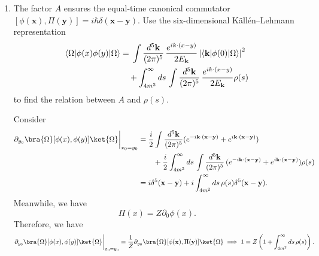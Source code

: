 \begin{enumerate}[label=\alph*)]
    \item The factor $A$ ensures the equal-time canonical commutator
    $[\phi(\mathbf x),\Pi(\mathbf y)]=i\hbar\delta(\mathbf x-\mathbf y)$.
    Use the six-dimensional K\"all\'en--Lehmann representation
    \begin{align}
        \langle\Omega|\phi(x)\phi(y)|\Omega\rangle
        &={}
        \int\frac{d^5\mathbf k}{(2\pi)^5}\,
        \frac{e^{ik\cdot(x-y)}}{2E_{\mathbf k}}
        \left|\langle\mathbf k|\phi(0)|\Omega\rangle\right|^2
        \notag\\
        &\quad+
        \int_{4m^2}^{\infty}ds\,
        \int\frac{d^5\mathbf k}{(2\pi)^5}\,
        \frac{e^{ik\cdot(x-y)}}{2E_{\mathbf k}}\rho(s)
    \end{align}
    to find the relation between $A$ and $\rho(s)$.
    \begin{solution}
        Consider
        \begin{equation}
            \begin{aligned}
                \partial_{y_0}\bra{\Omega}[\phi(x),\phi(y)]\ket{\Omega}\bigg|_{x_0 = y_0} &= \frac{i}{2}\int\frac{d^5\mathbf k}{(2\pi)^5}(e^{-i\mathbf{k}\cdot (\mathbf{x}-\mathbf{y})} + e^{i\mathbf{k}\cdot (\mathbf{x}-\mathbf{y})})\\
                &\qquad+ \frac{i}{2}\int_{4m^2}^{\infty}ds\,
        \int\frac{d^5\mathbf k}{(2\pi)^5}\,
        (e^{-i\mathbf{k}\cdot (\mathbf{x}-\mathbf{y})} + e^{i\mathbf{k}\cdot (\mathbf{x}-\mathbf{y})})\rho(s)\\
        &= i\delta^5(\mathbf{x}- \mathbf{y}) + i\int_{4m^2}^{\infty}ds\,\rho(s)\delta^5(\mathbf{x}- \mathbf{y}).
            \end{aligned}
        \end{equation}
        Meanwhile, we have
        \begin{equation}
            \Pi(x) = Z \partial_0\phi(x).
        \end{equation}
        Therefore, we have
        \begin{equation}
            \partial_{y_0}\bra{\Omega}[\phi(x),\phi(y)]\ket{\Omega}\bigg|_{x_0 = y_0} = \frac{1}{Z}\partial_{y_0}\bra{\Omega}[\phi(\mathbf x),\Pi(\mathbf y)]\ket{\Omega} \implies 1 = Z\left(1+\int_{4m^2}^{\infty}ds\,\rho(s)\right).
        \end{equation}
    \end{solution}


\end{enumerate}
